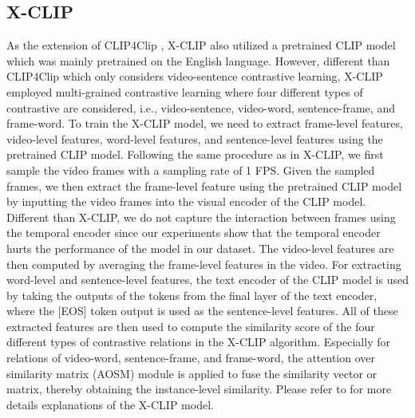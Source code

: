 \documentclass{article}
\begin{document}
\subsection{X-CLIP}
As the extension of CLIP4Clip \cite{10.1145/3474085.3479207}, X-CLIP \cite{10.1145/3503161.3547910} also utilized a pretrained CLIP model which was mainly pretrained on the English language. However, different than CLIP4Clip which only considers video-sentence contrastive learning, X-CLIP employed multi-grained contrastive learning where four different types of contrastive are considered, i.e., video-sentence, video-word, sentence-frame, and frame-word. To train the X-CLIP model, we need to extract frame-level features, video-level features, word-level features, and sentence-level features using the pretrained CLIP model. Following the same procedure as in X-CLIP, we first sample the video frames with a sampling rate of 1 FPS. Given the sampled frames, we then extract the frame-level feature using the pretrained CLIP model by inputting the video frames into the visual encoder of the CLIP model. Different than X-CLIP, we do not capture the interaction between frames using the temporal encoder \cite{10.1145/3503161.3547910} since our experiments show that the temporal encoder hurts the performance of the model in our dataset. The video-level features are then computed by averaging the frame-level features in the video. For extracting word-level and sentence-level features, the text encoder of the CLIP model is used by taking the outputs of the tokens from the final layer of the text encoder, where the [EOS] token output is used as the sentence-level features. All of these extracted features are then used to compute the similarity score of the four different types of contrastive relations in the X-CLIP algorithm. Especially for relations of video-word, sentence-frame, and frame-word, the attention over similarity matrix (AOSM) module \cite{10.1145/3503161.3547910} is applied to fuse the similarity vector or matrix, thereby obtaining the instance-level similarity. Please refer to \cite{10.1145/3503161.3547910} for more details explanations of the X-CLIP model. 
\end{document}
